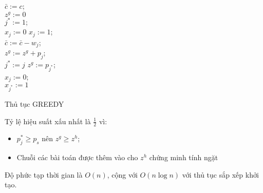 \begin{algorithm}[!ht]
    \DontPrintSemicolon
    \vspace{1em}
    \vspace{1em}

    $\bar{c} :=  c$;\\
    $z^g := 0$\\
    $j^* := 1$;\\
    {
        {
            $x_j := 0$
        }
        \Else
        {
            $x_j := 1$;\\
            $\bar{c} := \bar{c} - w_j$;\\
            $z^g := z^g + p_j$;\\
        }
        {
            $j^* := j$
        }
    }
    {
        $z^g := p_{j^*}$;\\
        {
            $x_j := 0$;\\
        }
        $x_{j^*} := 1$
    }
    \caption{Thủ tục GREEDY}
\end{algorithm}

Tỷ lệ hiệu suất xấu nhất là $\frac{1}{2}$ vì:
\begin{itemize}
    \item $p_j^* \geq p_s$ nên $z^g \geq z^h$;
    \item Chuỗi các bài toán được thêm vào cho $z^h$ chứng minh tính ngặt
\end{itemize}
Độ phức tạp thời gian là $O(n)$, cộng với $O(n\log n)$ với thủ tục sắp xếp khởi tạo.


